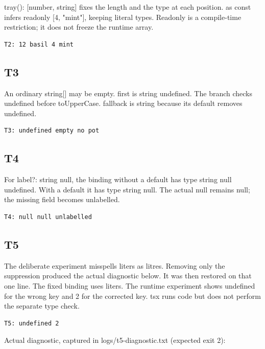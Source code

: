 \documentclass[
  10pt,
  a4paper,
]{article}
\begin{document}
tray(): {[}number, string{]} fixes the length and the type at each
position. as const infers readonly {[}4, "mint"{]}, keeping literal
types. Readonly is a compile-time restriction; it does not freeze the
runtime array.

\begin{lstlisting}
T2: 12 basil 4 mint
\end{lstlisting}

\subsection{T3}\label{t3}

An ordinary string{[}{]} may be empty. first is string \textbar{}
undefined. The branch checks undefined before toUpperCase. fallback is
string because its default removes undefined.

\begin{lstlisting}
T3: undefined empty no pot
\end{lstlisting}

\subsection{T4}\label{t4}

For label?: string \textbar{} null, the binding without a default has
type string \textbar{} null \textbar{} undefined. With a default it has
type string \textbar{} null. The actual null remains null; the missing
field becomes unlabelled.

\begin{lstlisting}
T4: null null unlabelled
\end{lstlisting}

\subsection{T5}\label{t5}

The deliberate experiment misspells liters as litres. Removing only the
suppression produced the actual diagnostic below. It was then restored
on that one line. The fixed binding uses liters. The runtime experiment
shows undefined for the wrong key and 2 for the corrected key. tsx runs
code but does not perform the separate type check.

\begin{lstlisting}
T5: undefined 2
\end{lstlisting}

Actual diagnostic, captured in logs/t5-diagnostic.txt (expected exit 2):
\end{document}
